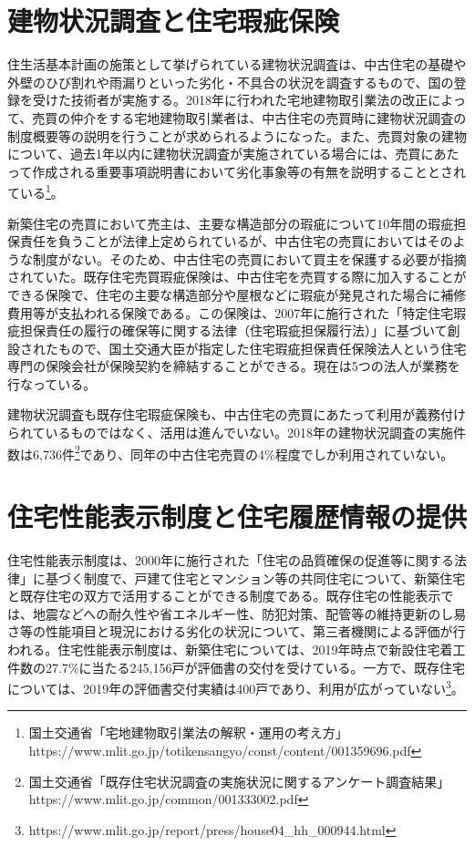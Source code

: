 \documentclass[a4paper,fontsize=11pt,report,notitlepage,line_length=38zw,number_of_lines=40]{jlreq}
\begin{document}
\section{建物状況調査と住宅瑕疵保険}
住生活基本計画の施策として挙げられている建物状況調査は、中古住宅の基礎や外壁のひび割れや雨漏りといった劣化・不具合の状況を調査するもので、国の登録を受けた技術者が実施する。2018年に行われた宅地建物取引業法の改正によって、売買の仲介をする宅地建物取引業者は、中古住宅の売買時に建物状況調査の制度概要等の説明を行うことが求められるようになった。また、売買対象の建物について、過去1年以内に建物状況調査が実施されている場合には、売買にあたって作成される重要事項説明書において劣化事象等の有無を説明することとされている\footnote{国土交通省「宅地建物取引業法の解釈・運用の考え方」https://www.mlit.go.jp/totikensangyo/const/content/001359696.pdf}。

新築住宅の売買において売主は、主要な構造部分の瑕疵について10年間の瑕疵担保責任を負うことが法律上定められているが、中古住宅の売買においてはそのような制度がない。そのため、中古住宅の売買において買主を保護する必要が指摘されていた。既存住宅売買瑕疵保険は、中古住宅を売買する際に加入することができる保険で、住宅の主要な構造部分や屋根などに瑕疵が発見された場合に補修費用等が支払われる保険である。この保険は、2007年に施行された「特定住宅瑕疵担保責任の履行の確保等に関する法律（住宅瑕疵担保履行法）」に基づいて創設されたもので、国土交通大臣が指定した住宅瑕疵担保責任保険法人という住宅専門の保険会社が保険契約を締結することができる。現在は5つの法人が業務を行なっている。

建物状況調査も既存住宅瑕疵保険も、中古住宅の売買にあたって利用が義務付けられているものではなく、活用は進んでいない。2018年の建物状況調査の実施件数は6,736件\footnote{国土交通省「既存住宅状況調査の実施状況に関するアンケート調査結果」https://www.mlit.go.jp/common/001333002.pdf}であり、同年の中古住宅売買の4\%程度でしか利用されていない。

\section{住宅性能表示制度と住宅履歴情報の提供}
住宅性能表示制度は、2000年に施行された「住宅の品質確保の促進等に関する法律」に基づく制度で、戸建て住宅とマンション等の共同住宅について、新築住宅と既存住宅の双方で活用することができる制度である。既存住宅の性能表示では、地震などへの耐久性や省エネルギー性、防犯対策、配管等の維持更新のし易さ等の性能項目と現況における劣化の状況について、第三者機関による評価が行われる。住宅性能表示制度は、新築住宅については、2019年時点で新設住宅着工件数の27.7\%に当たる245,156戸が評価書の交付を受けている。一方で、既存住宅については、2019年の評価書交付実績は400戸であり、利用が広がっていない\footnote{https://www.mlit.go.jp/report/press/house04\_hh\_000944.html}。
\end{document}
